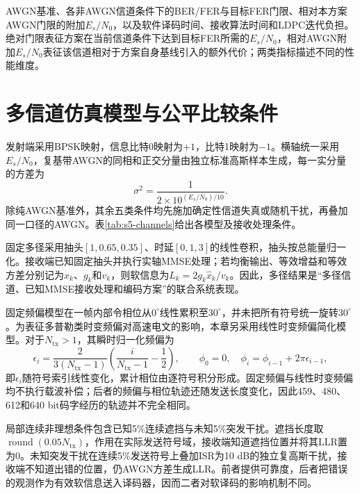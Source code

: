 AWGN基准、各非AWGN信道条件下的BER/FER与目标FER门限、相对本方案AWGN门限的附加$E_s/N_0$，以及软件译码时间、接收算法时间和LDPC迭代负担。绝对门限表征方案在当前信道条件下达到目标FER所需的$E_s/N_0$，相对AWGN附加$E_s/N_0$表征该信道相对于方案自身基线引入的额外代价；两类指标描述不同的性能维度。


\section{多信道仿真模型与公平比较条件}

发射端采用BPSK映射，信息比特0映射为$+1$，比特1映射为$-1$。横轴统一采用$E_s/N_0$，复基带AWGN的同相和正交分量由独立标准高斯样本生成，每一实分量的方差为
\begin{equation}
\sigma^2=\frac{1}{2\times10^{(E_s/N_0)/10}}.
\end{equation}
除纯AWGN基准外，其余五类条件均先施加确定性信道失真或随机干扰，再叠加同一口径的AWGN。表\ref{tab:s5-channels}给出各模型及接收处理条件。

固定多径采用抽头$[1,0.65,0.35]$、时延$[0,1,3]$的线性卷积，抽头按总能量归一化。接收端已知固定抽头并执行实轴MMSE处理；若均衡输出、等效增益和等效方差分别记为$\hat{x}_k$、$g_k$和$v_k$，则软信息为$L_k=2g_k\hat{x}_k/v_k$。因此，多径结果是“多径信道、已知MMSE接收处理和编码方案”的联合系统表现。

固定频偏模型在一帧内部令相位从$0^\circ$线性累积至$30^\circ$，并未把所有符号统一旋转$30^\circ$。为表征多普勒类时变频偏对高速电文的影响，本章另采用线性时变频偏简化模型。对于$N_{\mathrm{tx}}>1$，其瞬时归一化频偏为
\begin{equation}
\epsilon_i=\frac{2}{3(N_{\mathrm{tx}}-1)}\left(\frac{i}{N_{\mathrm{tx}}-1}-\frac{1}{2}\right),
\qquad
\phi_0=0,\quad \phi_i=\phi_{i-1}+2\pi\epsilon_{i-1},
\end{equation}
即$\epsilon_i$随符号索引线性变化，累计相位由逐符号积分形成。固定频偏与线性时变频偏均不执行载波补偿；后者的频偏与相位轨迹还随发送长度变化，因此459、480、612和640 bit码字经历的轨迹并不完全相同。

局部连续非理想条件包含已知5\%连续遮挡与未知5\%突发干扰。遮挡长度取$\operatorname{round}(0.05N_{\mathrm{tx}})$，作用在实际发送符号域，接收端知道遮挡位置并将其LLR置为0。未知突发干扰在连续5\%发送符号上叠加ISR为10 dB的独立复高斯干扰，接收端不知道出错的位置，仍AWGN方差生成LLR。前者提供可靠度，后者把错误的观测作为有效软信息送入译码器，因而二者对软译码的影响机制不同。

